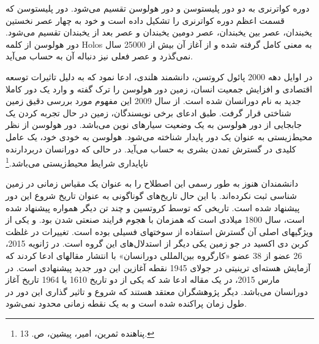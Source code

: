 دوره کواترنری به دو دور پلیستوسن  و دور هولوسن  تقسیم می‌شود. دور پلیستوسن که قسمت اعظم دوره کواترنری را تشکیل داده است و خود به چهار عصر نخستین یخبندان، عصر بین یخبندان، عصر دومین یخبندان و عصر بعد از یخبندان تقسیم می‌شود. دور هولوسن از کلمه Holos به معنی کامل گرفته شده و از آغاز آن بیش از 25000 سال نمی‌گذرد و عصر فعلی نیز دنباله آن به حساب می‌آید.

در اوایل دهه 2000 پائول کروتسن، دانشمند هلندی، ادعا نمود که به دلیل تاثیرات توسعه اقتصادی و افزایش جمعیت انسان، زمین دور هولوسن را ترک گفته و وارد یک دور کاملا جدید به نام دورانسان شده است. از سال 2009 این مفهوم مورد بررسی دقیق زمین شناختی قرار گرفت. طبق ادعای برخی نویسندگان، زمین در حال تجربه کردن یک جابجایی از دور هولوسن به یک وضعیت سیارهای نوین می‌باشد. دور هولوسن از نظر محیط‌زیستی به عنوان یک دور پایدار شناخته می‌شود. هولوسن به خودی خود، یک عامل کلیدی در گسترش تمدن بشری به حساب می‌آید. در حالی که دورانسان دربردارنده ناپایداری شرایط محیط‌زیستی می‌باشد.\footnote{پناهنده ثمرین، امیر، پیشین، ص. 13.} 

دانشمندان هنوز به طور رسمی این اصطلاح را به عنوان یک مقیاس زمانی در زمین شناسی ثبت نکرده‌اند. با این حال تاریخ‌های گوناگونی به عنوان تاریخ شروع این دور پیشنهاد شده است. تاریخی که توسط کروتسین و چند تن دیگر همواره پیشنهاد شده است، سال 1800 میلادی است که همزمان با هجوم فرایند صنعتی شدن بود. و یکی از ویژگیهای اصلی آن گسترش استفاده از سوختهای فسیلی بوده است. تغییرات در غلظت کربن دی اکسید در جو زمین یکی دیگر از استدلال‌های این گروه است.  در ژانویه 2015، 26 عضو از 38 عضو «کارگروه بین‌المللی دورانسان» با انتشار مقالهای ادعا کردند که آزمایش هسته‌ای ترینیتی در جولای  1945 نقطه آغازین این دور جدید پیشنهادی است. در مارس 2015، در یک مقاله ادعا شد که یکی از دو تاریخ 1610 یا 1964 تاریخ آغاز دورانسان می‌باشد.  دیگر پژوهشگران معتقد هستند که شروع و تاثیر گذاری این دور در طول زمان پراکنده شده است و به یک نقطه زمانی محدود نمی‌شود. 

